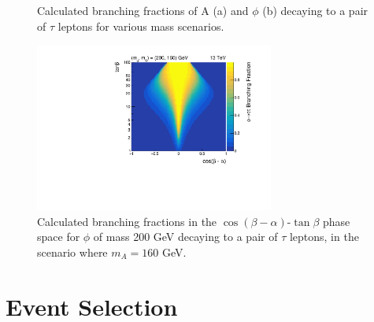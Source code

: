 \begin{figure}[!hbtp]
\centering
\caption{Calculated branching fractions of A (a) and $\phi$ (b) decaying to a pair of $\tau$ leptons for various mass scenarios.}
\label{fig:4tau_br_1d}
\end{figure}

\begin{figure}[!hbtp]
\centering
    \includegraphics[width=0.7\textwidth]{Figures/phi_branching_fractions_mphi200_mA160.pdf}
\caption{Calculated branching fractions in the $\cos(\beta-\alpha)$-$\tan\beta$ phase space for $\phi$ of mass 200 GeV decaying to a pair of $\tau$ leptons, in the scenario where $m_A = 160$ GeV.}
\label{fig:4tau_br_2d}
\end{figure}

\section{Event Selection}


